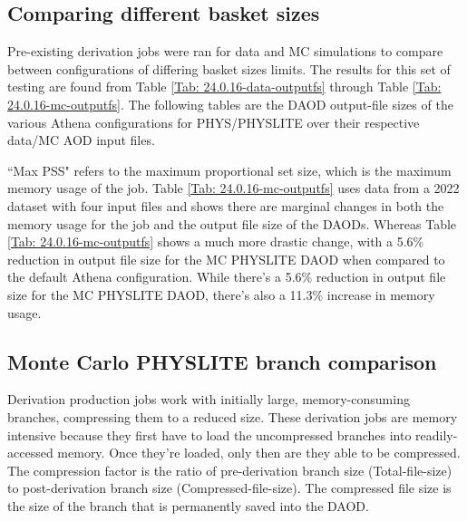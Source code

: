 \subsection{Comparing different basket sizes}
\label{sec:DAODProd_Results_comparing}

Pre-existing derivation jobs were ran for data and MC simulations to compare between configurations of differing basket sizes limits. 
The results for this set of testing are found from Table \ref{Tab: 24.0.16-data-outputfs} through Table \ref{Tab: 24.0.16-mc-outputfs}. 
The following tables are the DAOD output-file sizes of the various Athena configurations for PHYS/PHYSLITE over their respective data/MC AOD input files. 
\vspace{15px}


\vspace{15px}

``Max PSS" refers to the maximum proportional set size, which is the maximum memory usage of the job.
Table \ref{Tab: 24.0.16-mc-outputfs} uses data from a 2022 dataset with four input files and shows there are marginal changes in both the memory usage for the job and the output file size of the DAODs. 
Whereas Table \ref{Tab: 24.0.16-mc-outputfs} shows a much more drastic change, with a 5.6\% reduction in output file size for the MC PHYSLITE DAOD when compared to the default Athena configuration.
While there's a 5.6\% reduction in output file size for the MC PHYSLITE DAOD, there's also a 11.3\% increase in memory usage. 


\subsection{Monte Carlo PHYSLITE branch comparison}
\label{sec:DAODProd_Results_Monte}

Derivation production jobs work with initially large, memory-consuming branches, compressing them to a reduced size. 
These derivation jobs are memory intensive because they first have to load the uncompressed branches into readily-accessed memory. 
Once they're loaded, only then are they able to be compressed. 
The compression factor is the ratio of pre-derivation branch size (Total-file-size) to post-derivation branch size (Compressed-file-size). 
The compressed file size is the size of the branch that is permanently saved into the DAOD.  

